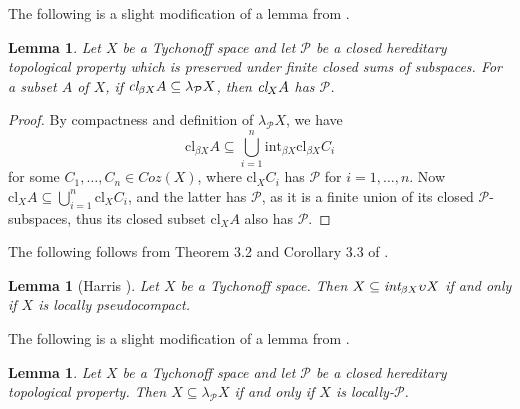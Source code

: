 \documentclass{amsart}
\newtheorem{lemma}[theorem]{Lemma}
\theoremstyle{definition}
\theoremstyle{remark}
\theoremstyle{notation}
\numberwithin{equation}{section}
\begin{document}
The following is a slight modification of a lemma from \cite{Ko3}.

\begin{lemma}\label{HGKFH}
Let $X$ be a Tychonoff  space and let ${\mathcal P}$ be a closed hereditary topological property which is preserved under  finite closed sums of subspaces. For a subset  $A$ of $X$, if $\mbox{\em cl}_{\beta X}A\subseteq\lambda_{{\mathcal P}} X$, then $\mbox{\em cl}_X A$ has ${\mathcal P}$.
\end{lemma}

\begin{proof}
By compactness and definition of
$\lambda_{{\mathcal P}} X$, we have
\[\mbox{cl}_{\beta X}A\subseteq\bigcup_{i=1}^n\mbox{int}_{\beta X}\mbox{cl}_{\beta X}C_i\]
for some $C_1,\ldots,C_n\in Coz(X)$, where $\mbox{cl}_X C_i$ has  ${\mathcal P}$ for $i=1,\ldots,n$.
Now $\mbox{cl}_X A\subseteq\bigcup_{i=1}^n\mbox{cl}_X C_i$, and the latter has ${\mathcal P}$, as it is a finite union of its closed  ${\mathcal P}$-subspaces, thus its closed subset $\mbox{cl}_X A$ also has ${\mathcal P}$.
\end{proof}

The following  follows from Theorem 3.2 and Corollary 3.3 of \cite{Ha}.

\begin{lemma}[Harris \cite{Ha}]\label{HGJHG}
Let $X$ be a Tychonoff space. Then $X\subseteq\mbox{\em int}_{\beta X}\upsilon X$ if and only if $X$ is locally pseudocompact.
\end{lemma}

The following is a slight modification of a lemma from \cite{Ko3}.

\begin{lemma}\label{JHG}
Let $X$ be a Tychonoff space and let $\mathcal{P}$ be a closed hereditary topological property.  Then $X\subseteq\lambda_{{\mathcal P}} X$ if
and only if $X$ is locally-$\mathcal{P}$.
\end{lemma}
\end{document}
